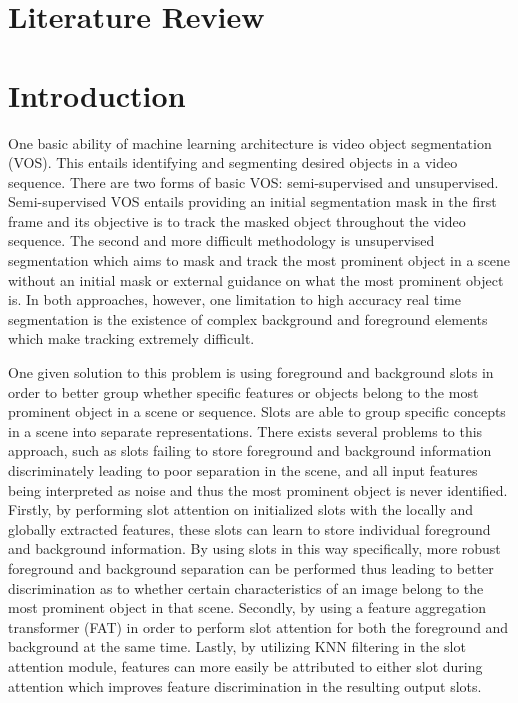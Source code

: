 \documentclass{article}
\theoremstyle{plain}
\theoremstyle{definition}
\theoremstyle{remark}
\begin{document}
\section*{\centering Literature Review}
\section*{Introduction}
\label{submission}
\hspace{20pt} One basic ability of machine learning architecture is video object segmentation (VOS). This entails identifying and segmenting desired objects in a video sequence. There are two forms of basic VOS: semi-supervised and unsupervised. Semi-supervised VOS entails providing an initial segmentation mask in the first frame and its objective is to track the masked object throughout the video sequence. The second and more difficult methodology is unsupervised segmentation which aims to mask and track the most prominent object in a scene without an initial mask or external guidance on what the most prominent object is. In both approaches, however, one limitation to high accuracy real time segmentation is the existence of complex background and foreground elements which make tracking extremely difficult. 

\hspace{20pt} One given solution to this problem is using foreground and background slots in order to better group whether specific features or objects belong to the most prominent object in a scene or sequence. Slots are able to group specific concepts in a scene into separate representations. There exists several problems to this approach, such as slots failing to store foreground and background information discriminately leading to poor separation in the scene, and all input features being interpreted as noise and thus the most prominent object is never identified. Firstly, by performing slot attention on initialized slots with the locally and globally extracted features, these slots can learn to store individual foreground and background information. By using slots in this way specifically, more robust foreground and background separation can be performed thus leading to better discrimination as to whether certain characteristics of an image belong to the most prominent object in that scene. Secondly, by using a feature aggregation transformer (FAT) in order to perform slot attention for both the foreground and background at the same time. Lastly, by utilizing KNN filtering in the slot attention module, features can more easily be attributed to either slot during attention which improves feature discrimination in the resulting output slots.
\end{document}
